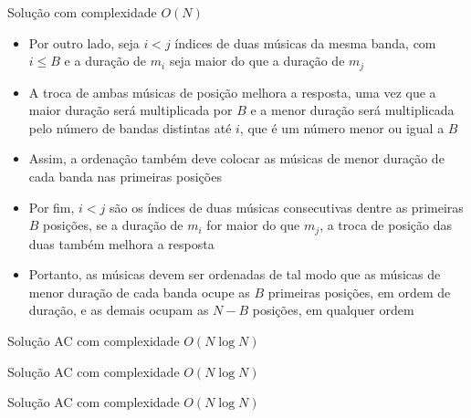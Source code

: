 \begin{frame}[fragile]{Solução com complexidade $O(N)$}

    \begin{itemize}
        \item Por outro lado, seja $i < j$ índices de duas músicas da mesma banda, com
            $i \leq B$ e a duração de $m_i$ seja maior do que a duração de $m_j$

        \item A troca de ambas músicas de posição melhora a resposta, uma vez que a maior duração
            será multiplicada por $B$ e a menor duração será multiplicada pelo número de
            bandas distintas até $i$, que é um número menor ou igual a $B$

        \item Assim, a ordenação também deve colocar as músicas de menor duração de cada banda
            nas primeiras posições

        \item Por fim, $i < j$ são os índices de duas músicas consecutivas dentre as primeiras 
            $B$ posições, se a duração de $m_i$ for maior do que $m_j$, a troca de posição das
            duas também melhora a resposta

        \item Portanto, as músicas devem ser ordenadas de tal modo que as músicas de menor duração
            de cada banda ocupe as $B$ primeiras posições, em ordem de duração, e as demais
            ocupam as $N - B$ posições, em qualquer ordem 
    \end{itemize}

\end{frame}

\begin{frame}[fragile]{Solução AC com complexidade $O(N\log N)$}
\end{frame}

\begin{frame}[fragile]{Solução AC com complexidade $O(N\log N)$}
\end{frame}

\begin{frame}[fragile]{Solução AC com complexidade $O(N\log N)$}
\end{frame}
